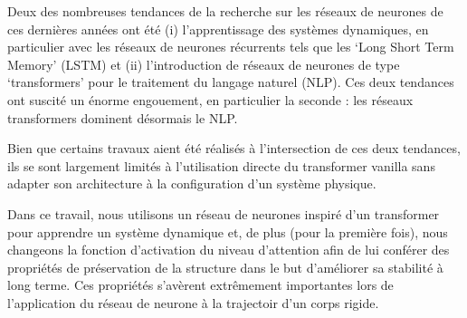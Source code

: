 Deux des nombreuses tendances de la recherche sur les réseaux de neurones de ces dernières années ont été (i) l'apprentissage des systèmes dynamiques, en particulier avec les réseaux de neurones récurrents tels que les `Long Short Term Memory' (LSTM) et (ii) l'introduction de réseaux de neurones de type `transformers' pour le traitement du langage naturel (NLP). Ces deux tendances ont suscité un énorme engouement, en particulier la seconde : les réseaux transformers dominent désormais le NLP.

Bien que certains travaux aient été réalisés à l'intersection de ces deux tendances, ils se sont largement limités à l'utilisation directe du transformer vanilla sans adapter son architecture à la configuration d'un système physique.

Dans ce travail, nous utilisons un réseau de neurones inspiré d'un transformer pour apprendre un système dynamique et, de plus (pour la première fois), nous changeons la fonction d'activation du niveau d'attention afin de lui conférer des propriétés de préservation de la structure dans le but d'améliorer sa stabilité à long terme. Ces propriétés s'avèrent extrêmement importantes lors de l'application du réseau de neurone à la trajectoir d'un corps rigide.